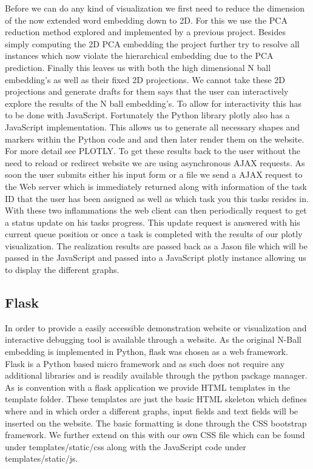 \documentclass[]{article}
\begin{document}
Before we can do any kind of visualization we first need to reduce the dimension of the now extended word embedding down to 2D. For this we use the PCA reduction method explored and implemented by a previous project. Besides simply computing the 2D PCA embedding the project further try to resolve all instances which now violate the hierarchical embedding due to the PCA prediction. Finally this leaves us with both the high dimensional N ball embedding's as well as their fixed 2D projections.
We cannot take these 2D projections and generate drafts for them says that the user can interactively explore the results of the N ball embedding's. To allow for interactivity this has to be done with JavaScript. Fortunately the Python library plotly also has a JavaScript implementation. This allows us to generate all necessary shapes and markers within the Python code and and then later render them on the website. For more detail see PLOTLY.
To get these results back to the user without the need to reload or redirect website we are using asynchronous AJAX requests. As soon the user submits either his input form or a file we send a AJAX request to the Web server which is immediately returned along with information of the task ID that the user has been assigned as well as which task you this tasks resides in. With these two inflammations the web client can then periodically request to get a status update on his tasks progress. This update request is answered with his current queue position or once a task is completed with the results of our plotly visualization. The realization results are passed back as a Jason file which will be passed in the JavaScript and passed into a JavaScript plotly instance allowing us to display the different graphs.

\subsection{Flask}
In order to provide a easily accessible demonstration website or visualization and interactive debugging tool is available through a website. As the original N-Ball embedding is implemented in Python, flask was chosen as a web framework.  Flask is a Python based micro framework and as such does not require any additional libraries and is readily available through the python package manager. 
As is convention with a flask application we provide HTML templates in the template folder. These templates are just the basic HTML skeleton which defines where and in which order a different graphs, input fields and text fields will be inserted on the website. The basic formatting is done through the CSS bootstrap framework. We further extend on this with our own CSS file which can be found under templates/static/css along with the JavaScript code under templates/static/js. 
\end{document}
